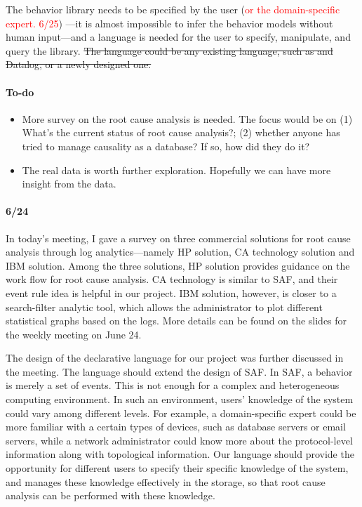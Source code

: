 \documentclass{article}
\begin{document}
The behavior library needs to be specified by the user (\textcolor{red}{or the
  domain-specific expert. 6/25}) ---it is almost impossible
to infer the behavior models without human input---and a language is needed for
the user to specify, manipulate, and query the library. \sout{The language could be any
existing language, such as \saf{} and Datalog, or a newly designed one.}

\paragraph{To-do}
\begin{itemize}
\item More survey on the root cause analysis is needed. The focus would be on
  (1) What's the current status of root cause analysis?; (2) whether anyone has
  tried to manage causality as a database? If so, how did they do it?
\item The real data is worth further exploration. Hopefully we can have more
  insight from the data.
\end{itemize}

\paragraph{6/24}

In today's meeting, I gave a survey on three commercial solutions for root
cause analysis through log
analytics---namely HP solution, CA technology solution and IBM solution. Among
the three solutions, HP solution provides guidance on the work flow
for root cause analysis. CA technology is similar to SAF, and their event rule
idea is helpful in our project. IBM solution, however, is closer to a
search-filter analytic tool, which allows the administrator to plot different
statistical graphs based on the logs. More details can be found on the slides
for the weekly meeting on June 24.

The design of the declarative language for our project was further discussed in
the meeting. The language should extend the design of SAF. In SAF, a behavior is merely
a set of events. This is not enough for a complex and heterogeneous computing
environment. In such an environment, users' knowledge of the system could vary among different
levels. For example, a domain-specific expert could be more familiar with a
certain types of devices, such as database servers or email servers, while a
network administrator could know more about the protocol-level information along with
topological information. Our language should provide the opportunity for
different users to specify their specific knowledge of the system, and manages these
knowledge effectively in the storage, so that root cause analysis can be
performed with these knowledge.
\end{document}
